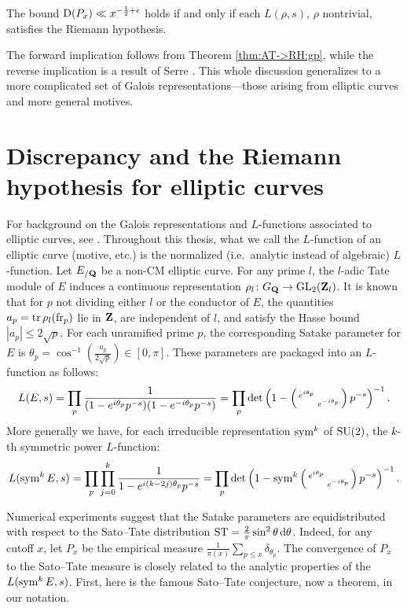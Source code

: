 \begin{theorem}
The bound $\operatorname{D}(P_x) \ll x^{-\frac 1 2+\epsilon}$ holds if and only if each
$L(\rho,s)$, $\rho$ nontrivial, satisfies the Riemann hypothesis. 
\end{theorem}

The forward implication follows from Theorem \ref{thm:AT->RH:gp}, while the reverse implication is a result of Serre \cite[Th.~4]{serre-1981}. 
This whole discussion generalizes to a more complicated set of Galois 
representations---those arising from elliptic curves and more general motives.  





\section{Discrepancy and the Riemann hypothesis for elliptic curves}

For background on the Galois representations and $L$-functions associated to 
elliptic curves, see \cite[III\S7, C\S17]{silverman-2009}. Throughout this 
thesis, what we call the $L$-function of an elliptic curve (motive, etc.) is 
the normalized (i.e.~analytic instead of algebraic) $L$-function. 
Let $E_{/\mathbf{Q}}$ be a non-CM elliptic curve. For any prime $l$, the $l$-adic Tate 
module of $E$ induces a continuous representation 
$\rho_l \colon G_{\mathbf{Q}} \to \operatorname{GL}_2(\mathbf{Z}_l)$. It is known that for $p$ not dividing 
either $l$ or the conductor of $E$, the quantities 
$a_p = \operatorname{tr} \rho_l(\mathrm{fr}_p)$ lie in $\mathbf{Z}$, are independent of $l$, and satisfy 
the Hasse bound $|a_p| \leqslant 2\sqrt p$. For each unramified prime $p$, the 
corresponding Satake parameter for $E$ is 
$\theta_p = \cos^{-1}\left(\frac{a_p}{2\sqrt p}\right) \in [0,\pi]$. 
These parameters are packaged into an $L$-function as follows:
\[
	L(E,s) = \prod_p \frac{1}{(1 - e^{i \theta_p} p^{-s})(1- e^{-i \theta_p} p^{-s})} = \prod_p \det\left(1 - \left(\begin{smallmatrix} e^{i\theta_p} &  \\  & e^{-i \theta_p} \end{smallmatrix}\right)p^{-s}\right)^{-1}.
\]
More generally we have, for each irreducible representation $\operatorname{sym}^k$ of 
$\operatorname{SU}(2)$, the $k$-th symmetric power $L$-function: 
\[
	L(\operatorname{sym}^k E, s) = \prod_p \prod_{j=0}^k \frac{1}{1 - e^{i (k - 2j) \theta_p} p^{-s}} = \prod_p \det\left(1-\operatorname{sym}^k \left(\begin{smallmatrix} e^{i\theta_p} &  \\  & e^{-i \theta_p} \end{smallmatrix}\right)p^{-s}\right)^{-1}.
\]

Numerical experiments suggest that the Satake parameters are equidistributed 
with respect to the Sato--Tate distribution 
$\mathrm{ST} = \frac{2}{\pi} \sin^2\theta\, \mathrm{d}\theta$. Indeed, for any cutoff $x$, let 
$P_x$ be the empirical measure 
$\frac{1}{\pi(x)} \sum_{p\leqslant x} \delta_{\theta_p}$. 
The convergence of $P_x$ to the Sato--Tate measure is closely related to 
the analytic properties of the $L(\operatorname{sym}^k E,s)$. First, here is the famous 
Sato--Tate conjecture, now a theorem, in our notation. 

